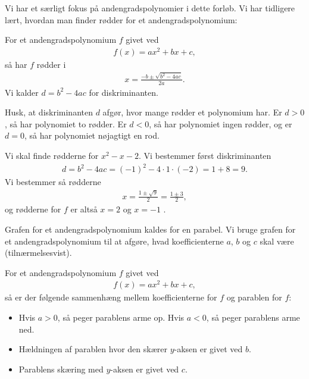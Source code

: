 Vi har et særligt fokus på andengradspolynomier i dette forløb. Vi har tidligere lært, hvordan man finder rødder for et andengradspolynomium:
\begin{setn}
For et andengradspolynomium $f$ givet ved
\begin{align*}
f(x) = ax^2+bx+c,
\end{align*}
så har $f$ rødder i 
\begin{align*}
x = \frac{-b\pm \sqrt{b^2-4ac}}{2a}.
\end{align*}
Vi kalder $d = b^2-4ac$ for diskriminanten.
\end{setn}
Husk, at diskriminanten $d$ afgør, hvor mange rødder et polynomium har. Er $d>0$, så har polynomiet to rødder. Er $d<0$, så har polynomiet ingen rødder, og er $d=0$, så har polynomiet nøjagtigt en rod. 
\begin{exa}
Vi skal finde rødderne for $x^2-x-2$. Vi bestemmer først diskriminanten
\begin{align*}
d = b^2-4ac = (-1)^2 -4\cdot 1\cdot(-2) = 1+8 = 9.
\end{align*}
Vi bestemmer så rødderne
\begin{align*}
x = \frac{1 \pm \sqrt{9}}{2} = \frac{1\pm 3}{2},
\end{align*}
og rødderne for $f$ er altså $x = 2$ og $x = -1$ . 
\end{exa}
Grafen for et andengradspolynomium kaldes for en parabel. Vi bruge grafen for et andengradspolynomium til at afgøre, hvad koefficienterne $a$, $b$ og $c$ skal være (tilnærmelsesvist).
\begin{setn}
For et andengradspolynomium $f$ givet ved
\begin{align*}
f(x) = ax^2+bx+c,
\end{align*}
så er der følgende sammenhæng mellem koefficienterne for $f$ og parablen for $f$:
\begin{itemize}
\item Hvis $a>0$, så peger parablens arme op. Hvis $a<0$, så peger parablens arme ned.
\item Hældningen af parablen hvor den skærer $y$-aksen er givet ved $b$.
\item Parablens skæring med $y$-aksen er givet ved $c$.
\end{itemize}
\end{setn}

